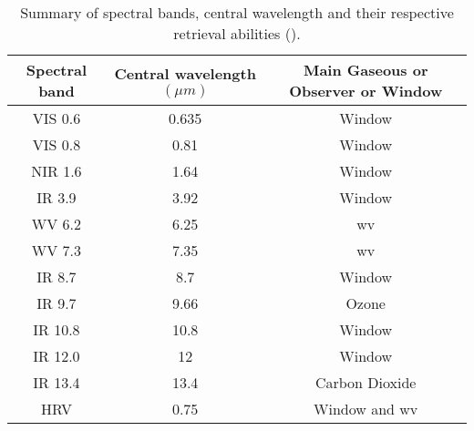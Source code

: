 \begin{table}[ht]
    \centering
    \setlength\extrarowheight{-7pt}
    \begin{tabular}{c|c|c}
        Spectral band & Central wavelength $\left( \mu m  \right)$ & Main Gaseous or
        Observer or Window \\ \hline
        VIS 0.6 & 0.635 & Window   \\ %
        VIS 0.8 & 0.81  & Window     \\ %
        NIR 1.6 & 1.64  & Window    \\ %
        IR 3.9 & 3.92  & Window     \\ %
        WV 6.2 & 6.25 & \acrlong{wv}  \\
        WV 7.3 & 7.35 & \acrlong{wv}  \\ 
        IR 8.7 & 8.7 &  Window       \\ %
        IR 9.7 & 9.66 & Ozone        \\
        IR 10.8 & 10.8 & Window  \\ %
        IR 12.0 & 12 & Window \\ %
        IR 13.4 & 13.4 & Carbon Dioxide  \\
        HRV & 0.75 & Window and \acrlong{wv}
    \end{tabular}
    \caption{Summary of spectral bands, central wavelength and their respective retrieval abilities (\cite{Schmetz_meteosat_intro}).}
    \label{tab:msg_spectral_bands}
\end{table}